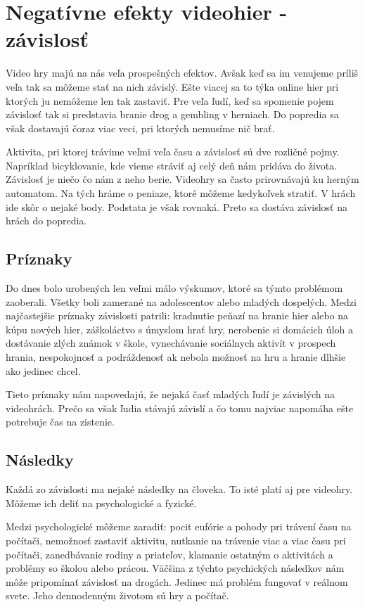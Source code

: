 \documentclass[10pt,oneside,slovak,a4paper]{article}
\begin{document}
\section{Negatívne efekty videohier - závislosť} \label{ina:neg}

Video hry majú na nás veľa prospešných efektov. Avšak keď sa im venujeme príliš veľa tak sa môžeme stať na nich závislý. Ešte viacej sa to týka online hier pri ktorých ju nemôžeme len tak zastaviť. Pre veľa ľudí, keď sa spomenie pojem závislosť tak si predstavia branie drog a gembling v herniach. Do popredia sa však dostavajú čoraz viac veci, pri ktorých nemusíme nič brať. 

Aktivita, pri ktorej trávime veľmi veľa času a závislosť sú dve rozličné pojmy. Napríklad bicyklovanie, kde vieme stráviť aj celý deň nám pridáva do života. Závislosť je niečo čo nám z neho berie. Videohry sa často prirovnávajú ku herným automatom. Na tých hráme o peniaze, ktoré môžeme kedykoľvek stratiť. V hrách ide skôr o nejaké body. Podstata je však rovnaká. Preto sa dostáva závislosť na hrách do popredia. \cite{addiction}
\subsection{Príznaky}

Do dnes bolo urobených len veľmi málo výskumov, ktoré sa týmto problémom zaoberali. Všetky boli zamerané na adolescentov alebo mladých dospelých. Medzi najčastejšie príznaky závislosti patrili: kradnutie peňazí na hranie hier alebo na kúpu nových hier, záškoláctvo s úmyslom hrať hry, nerobenie si domácich úloh a dostávanie zlých známok v škole, vynechávanie sociálnych aktivít v prospech hrania, nespokojnosť a podráždenosť ak nebola možnosť na hru a hranie dlhšie ako jedinec chcel. 

Tieto príznaky nám napovedajú, že nejaká časť mladých ľudí je závislých na videohrách. Prečo sa však ľudia stávajú závislí a čo tomu najviac napomáha ešte potrebuje čas na zistenie. 
\subsection{Následky}

Každá zo závislosti ma nejaké následky na človeka. To isté platí aj pre videohry. Môžeme ich deliť na psychologické a fyzické. 

Medzi psychologické môžeme zaradiť: pocit eufórie a pohody pri trávení času na počítači, nemožnosť zastaviť aktivitu, nutkanie na trávenie viac a viac času pri počítači, zanedbávanie rodiny a priateľov, klamanie ostatným o aktivitách a problémy so školou alebo prácou. Väčšina z týchto psychických následkov nám môže pripomínať závislosť na drogách. Jedinec má problém fungovať v reálnom svete. Jeho dennodenným životom sú hry a počítač. 
\end{document}
